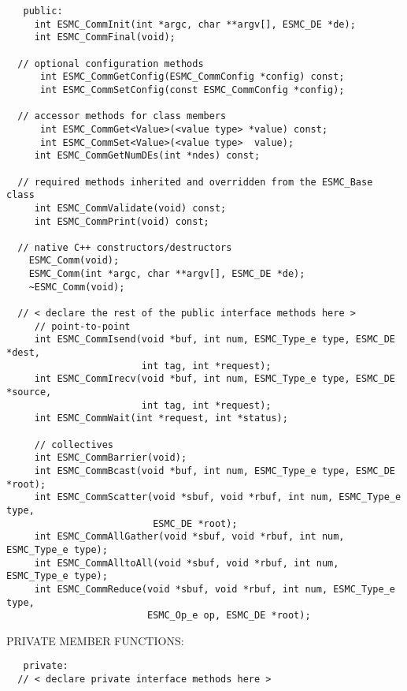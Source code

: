 \begin{verbatim}   public:
     int ESMC_CommInit(int *argc, char **argv[], ESMC_DE *de);
     int ESMC_CommFinal(void);
 
  // optional configuration methods
      int ESMC_CommGetConfig(ESMC_CommConfig *config) const;
      int ESMC_CommSetConfig(const ESMC_CommConfig *config);
 
  // accessor methods for class members
      int ESMC_CommGet<Value>(<value type> *value) const;
      int ESMC_CommSet<Value>(<value type>  value);
     int ESMC_CommGetNumDEs(int *ndes) const;
     
  // required methods inherited and overridden from the ESMC_Base class
     int ESMC_CommValidate(void) const;
     int ESMC_CommPrint(void) const;
 
  // native C++ constructors/destructors
 	ESMC_Comm(void);
 	ESMC_Comm(int *argc, char **argv[], ESMC_DE *de);
 	~ESMC_Comm(void);
   
  // < declare the rest of the public interface methods here >
     // point-to-point
     int ESMC_CommIsend(void *buf, int num, ESMC_Type_e type, ESMC_DE *dest,
                        int tag, int *request);
     int ESMC_CommIrecv(void *buf, int num, ESMC_Type_e type, ESMC_DE *source,
                        int tag, int *request);
     int ESMC_CommWait(int *request, int *status);
 
     // collectives
     int ESMC_CommBarrier(void);
     int ESMC_CommBcast(void *buf, int num, ESMC_Type_e type, ESMC_DE *root);
     int ESMC_CommScatter(void *sbuf, void *rbuf, int num, ESMC_Type_e type,
                          ESMC_DE *root);
     int ESMC_CommAllGather(void *sbuf, void *rbuf, int num, ESMC_Type_e type);
     int ESMC_CommAlltoAll(void *sbuf, void *rbuf, int num, ESMC_Type_e type);
     int ESMC_CommReduce(void *sbuf, void *rbuf, int num, ESMC_Type_e type,
                         ESMC_Op_e op, ESMC_DE *root);
   \end{verbatim}{\sf PRIVATE MEMBER FUNCTIONS:}
\begin{verbatim}   private: 
  // < declare private interface methods here >\end{verbatim}

